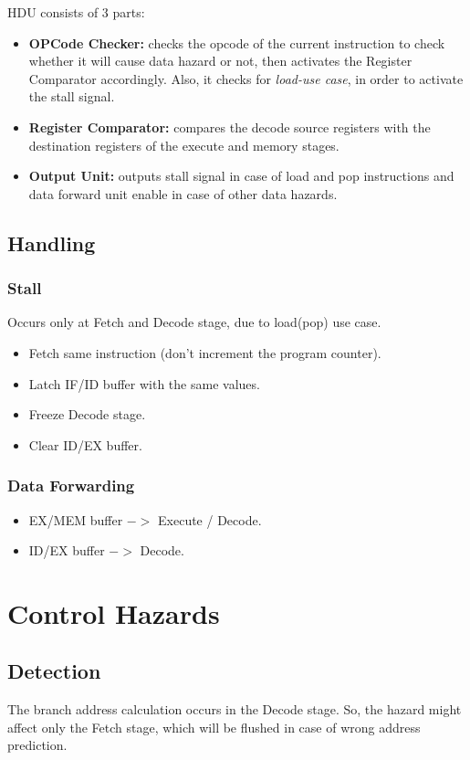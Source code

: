 HDU consists of 3 parts:
\begin{itemize}
    \item \textbf{OPCode Checker:} checks the opcode of the current instruction to check whether it will cause data hazard or not, then activates the Register Comparator accordingly. Also, it checks for \emph{load-use case}, in order to activate the stall signal.
    \item \textbf{Register Comparator:} compares the decode source registers with the destination registers of the execute and memory stages.
    \item \textbf{Output Unit:} outputs stall signal in case of load and pop instructions and data forward unit enable in case of other data hazards.
\end{itemize}

\subsection{Handling}

\subsubsection{Stall}
Occurs only at Fetch and Decode stage, due to load(pop) use case.
\begin{itemize}
    \item Fetch same instruction (don't increment the program counter).
    \item Latch IF/ID buffer with the same values.
    \item Freeze Decode stage.
    \item Clear ID/EX buffer.
\end{itemize}

\subsubsection{Data Forwarding}
\begin{itemize}
    \item EX/MEM buffer $->$ Execute / Decode.
    \item ID/EX buffer $->$ Decode.
\end{itemize}

\section{Control Hazards}

\subsection{Detection}
The branch address calculation occurs in the Decode stage. So, the hazard might affect only the Fetch stage, which will be flushed in case of wrong address prediction.


